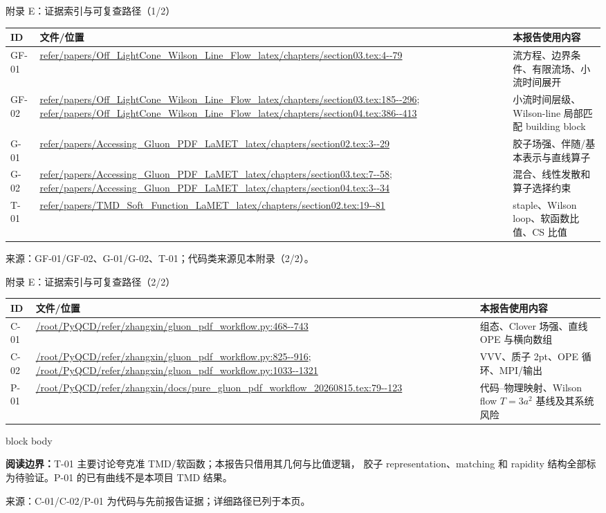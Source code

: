 \documentclass[UTF8,aspectratio=169,11pt]{ctexbeamer}
\newcommand{\source}[1]{%
  \par\vspace{0.05em}%
  {\raggedright\scriptsize\color{muted}来源：#1\par}}
\begin{document}
\begin{frame}[t]{附录 E：证据索引与可复查路径（1/2）}
  \scriptsize
  \begin{tabularx}{\textwidth}{@{}>{\raggedright\arraybackslash}p{1.0cm}>{\raggedright\arraybackslash}p{6.1cm}>{\raggedright\arraybackslash}X@{}}
    \toprule
    ID & 文件/位置 & 本报告使用内容 \\
    \midrule
    GF-01 & \url{refer/papers/Off_LightCone_Wilson_Line_Flow_latex/chapters/section03.tex:4--79} & 流方程、边界条件、有限流场、小流时间展开 \\
    GF-02 & \url{refer/papers/Off_LightCone_Wilson_Line_Flow_latex/chapters/section03.tex:185--296}; \url{refer/papers/Off_LightCone_Wilson_Line_Flow_latex/chapters/section04.tex:386--413} & 小流时间层级、Wilson-line 局部匹配 building block \\
    G-01 & \url{refer/papers/Accessing_Gluon_PDF_LaMET_latex/chapters/section02.tex:3--29} & 胶子场强、伴随/基本表示与直线算子 \\
    G-02 & \url{refer/papers/Accessing_Gluon_PDF_LaMET_latex/chapters/section03.tex:7--58}; \url{refer/papers/Accessing_Gluon_PDF_LaMET_latex/chapters/section04.tex:3--34} & 混合、线性发散和算子选择约束 \\
    T-01 & \url{refer/papers/TMD_Soft_Function_LaMET_latex/chapters/section02.tex:19--81} & staple、Wilson loop、软函数比值、CS 比值 \\
    \bottomrule
  \end{tabularx}
  \source{GF-01/GF-02、G-01/G-02、T-01；代码类来源见本附录（2/2）。}
\end{frame}

\begin{frame}[t]{附录 E：证据索引与可复查路径（2/2）}
  \scriptsize
  \begin{tabularx}{\textwidth}{@{}>{\raggedright\arraybackslash}p{1.0cm}>{\raggedright\arraybackslash}p{6.1cm}>{\raggedright\arraybackslash}X@{}}
    \toprule
    ID & 文件/位置 & 本报告使用内容 \\
    \midrule
    C-01 & \url{/root/PyQCD/refer/zhangxin/gluon_pdf_workflow.py:468--743} & 组态、Clover 场强、直线 OPE 与横向数组 \\
    C-02 & \url{/root/PyQCD/refer/zhangxin/gluon_pdf_workflow.py:825--916}; \url{/root/PyQCD/refer/zhangxin/gluon_pdf_workflow.py:1033--1321} & VVV、质子 2pt、OPE 循环、MPI/输出 \\
    P-01 & \url{/root/PyQCD/refer/zhangxin/docs/pure_gluon_pdf_workflow_20260815.tex:79--123} & 代码--物理映射、Wilson flow $T=3a^2$ 基线及其系统风险 \\
    \bottomrule
  \end{tabularx}
  \vspace{0.35em}
  \begin{beamercolorbox}[wd=\textwidth,sep=0.55em,rounded=true]{block body}
    {\footnotesize
    \textbf{阅读边界：}T-01 主要讨论夸克准 TMD/软函数；本报告只借用其几何与比值逻辑，
    胶子 representation、matching 和 rapidity 结构全部标为待验证。P-01 的已有曲线不是本项目 TMD 结果。\par}
  \end{beamercolorbox}
  \source{C-01/C-02/P-01 为代码与先前报告证据；详细路径已列于本页。}
\end{frame}
\end{document}
